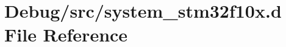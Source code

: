 \hypertarget{system__stm32f10x_8d}{}\section{Debug/src/system\+\_\+stm32f10x.d File Reference}
\label{system__stm32f10x_8d}

